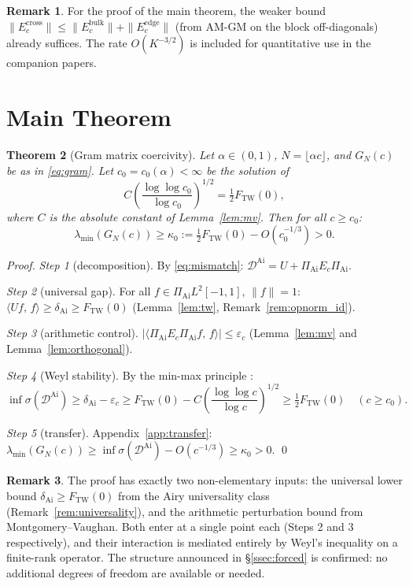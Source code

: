 \documentclass[12pt,a4paper]{amsart}
\newtheorem{theorem}{Theorem}[section]
\theoremstyle{definition}
\newtheorem{remark}[theorem]{Remark}
\newcommand{\DAi}{\mathcal{D}^{\mathrm{Ai}}}
\newcommand{\PAi}{\Pi_{\mathrm{Ai}}}
\newcommand{\GN}{G_N(c)}
\newcommand{\Ec}{E_c}
\newcommand{\norm}[1]{\|#1\|}
\newcommand{\ip}[2]{\langle #1,\, #2 \rangle}
\newcommand{\spec}{\sigma}
\newcommand{\FTW}{F_{\mathrm{TW}}(0)}
\newcommand{\dAi}{\delta_{\mathrm{Ai}}}
\begin{document}
\begin{remark}
For the proof of the main theorem, the weaker bound
$\norm{\Ec^{\mathrm{cross}}} \le \norm{\Ec^{\mathrm{bulk}}} + \norm{\Ec^{\mathrm{edge}}}$
(from AM-GM on the block off-diagonals) already suffices.
The rate $O(K^{-3/2})$ is included for quantitative use in the companion papers.
\end{remark}

\section{Main Theorem}
\label{sec:main}

\begin{theorem}[Gram matrix coercivity]\label{thm:main}
Let $\alpha \in (0,1)$, $N = \lfloor\alpha c\rfloor$,
and $\GN$ be as in \eqref{eq:gram}.
Let $c_0 = c_0(\alpha) < \infty$ be the solution of
\[
  C\left(\frac{\log\log c_0}{\log c_0}\right)^{1/2} = \tfrac{1}{2}\FTW,
\]
where $C$ is the absolute constant of Lemma~\ref{lem:mv}.
Then for all $c \ge c_0$:
\begin{equation}\label{eq:main}
  \lambda_{\min}(\GN)
  \ge \kappa_0 := \tfrac{1}{2}\FTW - O(c_0^{-1/3})
  > 0.
\end{equation}
\end{theorem}

\begin{proof}
\emph{Step 1} (decomposition).
By \eqref{eq:mismatch}: $\DAi = U + \PAi\Ec\PAi$.

\emph{Step 2} (universal gap).
For all $f \in \PAi L^2[-1,1]$, $\norm{f}=1$:
$\ip{Uf}{f} \ge \dAi \ge \FTW$ (Lemma~\ref{lem:tw},
Remark~\ref{rem:opnorm_id}).

\emph{Step 3} (arithmetic control).
$|\ip{\PAi\Ec\PAi f}{f}| \le \varepsilon_c$
(Lemma~\ref{lem:mv} and Lemma~\ref{lem:orthogonal}).

\emph{Step 4} (Weyl stability).
By the min-max principle \cite[Theorem~IV.3.18]{Kato1966}:
\[
  \inf\spec(\DAi)
  \ge \dAi - \varepsilon_c
  \ge \FTW - C\!\left(\frac{\log\log c}{\log c}\right)^{1/2}
  \ge \tfrac{1}{2}\FTW
  \quad (c \ge c_0).
\]

\emph{Step 5} (transfer).
Appendix~\ref{app:transfer}:
$\lambda_{\min}(\GN) \ge \inf\spec(\DAi) - O(c^{-1/3}) \ge \kappa_0 > 0$. \qed
\end{proof}

\begin{remark}
The proof has exactly two non-elementary inputs: the universal lower
bound $\dAi \ge \FTW$ from the Airy universality class
(Remark~\ref{rem:universality}), and the arithmetic perturbation bound
from Montgomery--Vaughan.
Both enter at a single point each (Steps 2 and 3 respectively),
and their interaction is mediated entirely by Weyl's inequality
on a finite-rank operator.
The structure announced in \S\ref{ssec:forced} is confirmed:
no additional degrees of freedom are available or needed.
\end{remark}
\end{document}
